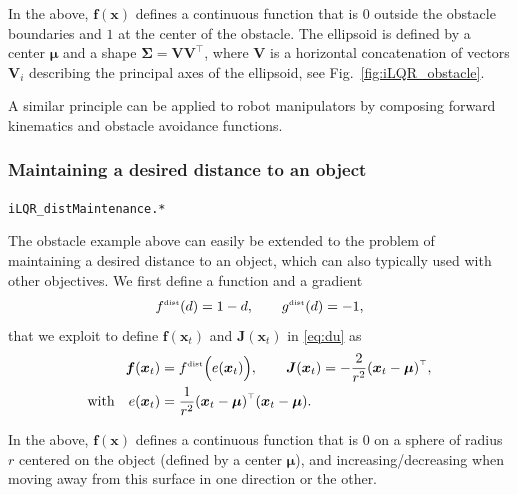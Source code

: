 \documentclass[10pt,a4paper]{article} %
\newcommand{\trsp}{{\scriptscriptstyle\top}}
\newcommand{\tp}[1]{\text{\tiny#1}}
\newcommand{\filename}[1]{\colorbox{rr2}{\color{white}\texttt{#1}}}
\begin{document}
In the above, $\bm{f}(\bm{x})$ defines a continuous function that is $0$ outside the obstacle boundaries and $1$ at the center of the obstacle. The ellipsoid is defined by a center $\bm{\mu}$ and a shape $\bm{\Sigma}=\bm{V}\bm{V}^\trsp$, where $\bm{V}$ is a horizontal concatenation of vectors $\bm{V}_i$ describing the principal axes of the ellipsoid, see Fig.~\ref{fig:iLQR_obstacle}. 

A similar principle can be applied to robot manipulators by composing forward kinematics and obstacle avoidance functions.  

%


\subsubsection{Maintaining a desired distance to an object} %
\begin{flushright}
\filename{iLQR\_distMaintenance.*}
\end{flushright}

The obstacle example above can easily be extended to the problem of maintaining a desired distance to an object, which can also typically used with other objectives. We first define a function and a gradient
\begin{equation*} 
	f^\tp{dist}(d) = 1-d, \quad\quad
	g^\tp{dist}(d) = -1,
\end{equation*}
that we exploit to define $\bm{f}(\bm{x}_t)$ and $\bm{J}(\bm{x}_t)$ in \eqref{eq:du} as
\begin{align*}
	\bm{f}(\bm{x}_t) &= f^\tp{dist}\Big( e(\bm{x}_t) \Big), \quad\quad
	\bm{J}(\bm{x}_t) = -\frac{2}{r^2} {(\bm{x}_t-\bm{\mu})}^\trsp ,\\ %
	\text{with}\quad e(\bm{x}_t) &= \frac{1}{r^2} {(\bm{x}_t-\bm{\mu})}^\trsp (\bm{x}_t-\bm{\mu}).
\end{align*}

In the above, $\bm{f}(\bm{x})$ defines a continuous function that is $0$ on a sphere of radius $r$ centered on the object (defined by a center $\bm{\mu}$), and increasing/decreasing when moving away from this surface in one direction or the other. 
\end{document}
